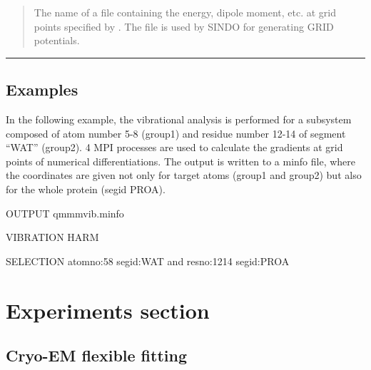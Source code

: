 \documentclass[a4paper,11pt,oneside,english]{sphinxmanual}
\begin{document}
 
\begin{quote}


The name of a file containing the energy, dipole moment, etc. at grid points
specified by .  The file is used by SINDO for generating GRID potentials.
\end{quote}


\bigskip\hrule\bigskip



\section{Examples}
\label{\detokenize{18_Vibration:examples}}
In the following example, the vibrational analysis is performed for a
subsystem composed of atom number 5-8 (group1) and residue number 12-14
of segment “WAT” (group2). 4 MPI processes are used to calculate the
gradients at grid points of numerical differentiations.
The output is written to a minfo file, where the coordinates are given
not only for target atoms (group1 and group2) but also for the whole protein
(segid PROA).

\begin{sphinxVerbatim}[commandchars=\\\{\}]
\PYG{o}{[}OUTPUT\PYG{o}{]}
  qmmm\PYGZus{}vib.minfo

\PYG{o}{[}VIBRATION\PYG{o}{]}
              HARM
             
   
     

\PYG{o}{[}SELECTION\PYG{o}{]}
   atomno:5\PYGZhy{}8
   segid:WAT and resno:12\PYGZhy{}14
   segid:PROA
\end{sphinxVerbatim}


\chapter{Experiments section}
\label{\detokenize{19_Experiments:experiments-section}}\label{\detokenize{19_Experiments:experiments}}\label{\detokenize{19_Experiments::doc}}

\section{Cryo-EM flexible fitting}
\label{\detokenize{19_Experiments:cryo-em-flexible-fitting}}
\end{document}
